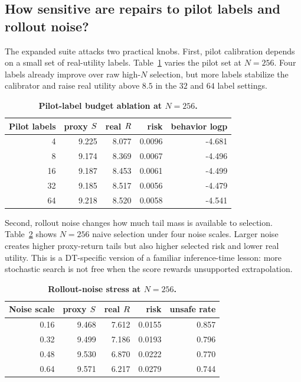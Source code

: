 \subsection{How sensitive are repairs to pilot labels and rollout noise?}

The expanded suite attacks two practical knobs. First, pilot calibration depends on a small set of real-utility labels. Table~\ref{tab:pilot} varies the pilot set at $N=256$. Four labels already improve over raw high-$N$ selection, but more labels stabilize the calibrator and raise real utility above $8.5$ in the $32$ and $64$ label settings.

\begin{table}[t]
\centering
\small
\caption{\textbf{Pilot-label budget ablation at $N=256$.}}
\label{tab:pilot}
\begin{tabular}{rrrrr}
\toprule
Pilot labels & proxy $S$ & real $R$ & risk & behavior logp \\
\midrule
4 & 9.225 & 8.077 & 0.0096 & -4.681 \\
8 & 9.174 & 8.369 & 0.0067 & -4.496 \\
16 & 9.187 & 8.453 & 0.0061 & -4.499 \\
32 & 9.185 & 8.517 & 0.0056 & -4.479 \\
64 & 9.218 & 8.520 & 0.0058 & -4.541 \\
\bottomrule
\end{tabular}
\end{table}

Second, rollout noise changes how much tail mass is available to selection. Table~\ref{tab:noise} shows $N=256$ naive selection under four noise scales. Larger noise creates higher proxy-return tails but also higher selected risk and lower real utility. This is a DT-specific version of a familiar inference-time lesson: more stochastic search is not free when the score rewards unsupported extrapolation.

\begin{table}[t]
\centering
\small
\caption{\textbf{Rollout-noise stress at $N=256$.}}
\label{tab:noise}
\begin{tabular}{rrrrr}
\toprule
Noise scale & proxy $S$ & real $R$ & risk & unsafe rate \\
\midrule
0.16 & 9.468 & 7.612 & 0.0155 & 0.857 \\
0.32 & 9.499 & 7.186 & 0.0193 & 0.796 \\
0.48 & 9.530 & 6.870 & 0.0222 & 0.770 \\
0.64 & 9.571 & 6.217 & 0.0279 & 0.744 \\
\bottomrule
\end{tabular}
\end{table}

